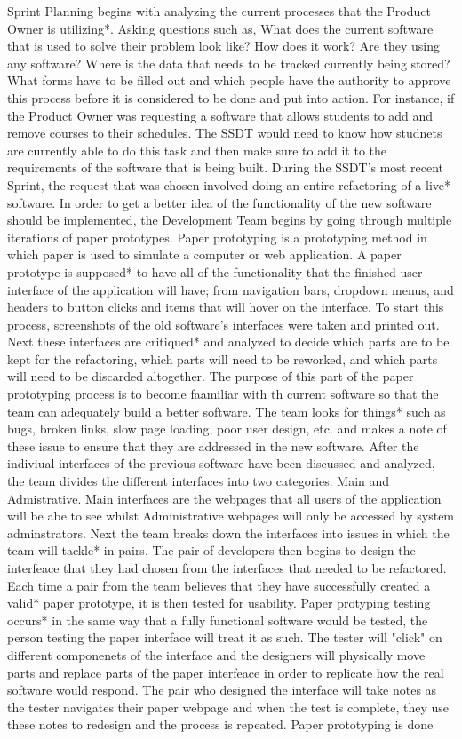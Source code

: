 Sprint Planning begins with analyzing the current processes that the Product Owner is utilizing*. Asking questions such as, What does the current software that is used to solve their problem look like? How does it work? Are they using any software? Where is the data that needs to be tracked currently being stored? What forms have to be filled out and which people have the authority to approve this process before it is considered to be done and put into action. For instance, if the Product Owner was requesting a software that allows students to add and remove courses to their schedules. The SSDT would need to know how studnets are currently able to do this task and then make sure to add it to the requirements of the software that is being built. During the SSDT's most recent Sprint, the request that was chosen involved doing an entire refactoring of a live* software. In order to get a better idea of the functionality of the new software should be implemented, the Development Team begins by going through multiple iterations of paper prototypes. Paper prototyping is a prototyping method in which paper is used to simulate a computer or web application. A paper prototype is supposed* to have all of the functionality that the finished user interface of the application will have; from navigation bars, dropdown menus, and headers to button clicks and items that will hover on the interface. To start this process, screenshots of the old software's interfaces were taken and printed out. Next these interfaces are critiqued* and analyzed to decide which parts are to be kept for the refactoring, which parts will need to be reworked, and which parts will need to be discarded altogether. The purpose of this part of the paper prototyping process is to become faamiliar with th current software so that the team can adequately build a better software. The team looks for things* such as bugs, broken links, slow page loading, poor user design, etc. and makes a note of these issue to ensure that they are addressed in the new software. After the indiviual interfaces of the previous software have been discussed and analyzed, the team divides the different interfaces into two categories: Main and Admistrative. Main interfaces are the webpages that all users of the application will be abe to see whilst Administrative webpages will only be accessed by system adminstrators. Next the team breaks down the interfaces into issues in which the team will tackle* in pairs. The pair of developers then begins to design the interfeace that they had chosen from the interfaces that needed to be refactored. Each time a pair from the team believes that they have successfully created a valid* paper prototype, it is then tested for usability. Paper protyping testing occurs* in  the same way that a fully functional software would be tested, the person testing the paper interface will treat it as such. The tester will "click" on different componenets of the interface and the designers will physically move parts and replace parts of the paper interfeace in order to replicate how the real software would respond. The pair who designed the interface will take notes as the tester navigates their paper webpage and when the test is complete, they use these notes to redesign and the process is repeated. Paper prototyping is done 